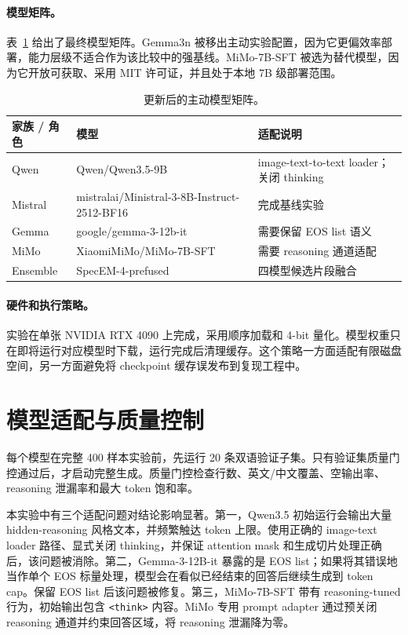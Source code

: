 \documentclass[11pt]{ctexart}
\begin{document}
\paragraph{模型矩阵。}
表~\ref{tab:models} 给出了最终模型矩阵。Gemma3n 被移出主动实验配置，因为它更偏效率部署，能力层级不适合作为该比较中的强基线。MiMo-7B-SFT 被选为替代模型，因为它开放可获取、采用 MIT 许可证，并且处于本地 7B 级部署范围。

\begin{table}[h]
\centering
\begin{tabular}{lll}
\toprule
家族 / 角色 & 模型 & 适配说明 \\
\midrule
Qwen & Qwen/Qwen3.5-9B & image-text-to-text loader；关闭 thinking \\
Mistral & mistralai/Ministral-3-8B-Instruct-2512-BF16 & 完成基线实验 \\
Gemma & google/gemma-3-12b-it & 需要保留 EOS list 语义 \\
MiMo & XiaomiMiMo/MiMo-7B-SFT & 需要 reasoning 通道适配 \\
Ensemble & SpecEM-4-prefused & 四模型候选片段融合 \\
\bottomrule
\end{tabular}
\caption{更新后的主动模型矩阵。}
\label{tab:models}
\end{table}

\paragraph{硬件和执行策略。}
实验在单张 NVIDIA RTX 4090 上完成，采用顺序加载和 4-bit 量化。模型权重只在即将运行对应模型时下载，运行完成后清理缓存。这个策略一方面适配有限磁盘空间，另一方面避免将 checkpoint 缓存误发布到复现工程中。

\section{模型适配与质量控制}
每个模型在完整 400 样本实验前，先运行 20 条双语验证子集。只有验证集质量门控通过后，才启动完整生成。质量门控检查行数、英文/中文覆盖、空输出率、reasoning 泄漏率和最大 token 饱和率。

本实验中有三个适配问题对结论影响显著。第一，Qwen3.5 初始运行会输出大量 hidden-reasoning 风格文本，并频繁触达 token 上限。使用正确的 image-text loader 路径、显式关闭 thinking，并保证 attention mask 和生成切片处理正确后，该问题被消除。第二，Gemma-3-12B-it 暴露的是 EOS list；如果将其错误地当作单个 EOS 标量处理，模型会在看似已经结束的回答后继续生成到 token cap。保留 EOS list 后该问题被修复。第三，MiMo-7B-SFT 带有 reasoning-tuned 行为，初始输出包含 \texttt{<think>} 内容。MiMo 专用 prompt adapter 通过预关闭 reasoning 通道并约束回答区域，将 reasoning 泄漏降为零。
\end{document}
